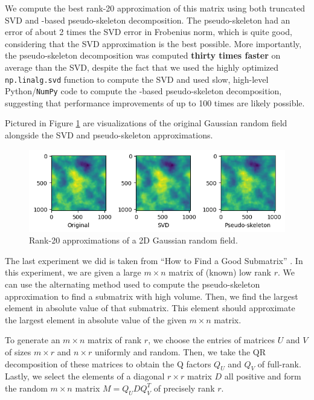 \documentclass{article}
\begin{document}
	We compute the best rank-20 approximation of this matrix using both truncated SVD and \maxvol{}-based pseudo-skeleton decomposition. The pseudo-skeleton had an error of about 2 times the SVD error in Frobenius norm, which is quite good, considering that the SVD approximation is the best possible. More importantly, the pseudo-skeleton decomposition was computed \textbf{thirty times faster} on average than the SVD, despite the fact that we used the highly optimized \texttt{np.linalg.svd} function to compute the SVD and used slow, high-level Python/\texttt{NumPy} code to compute the \maxvol{}-based pseudo-skeleton decomposition, suggesting that performance improvements of up to 100 times are likely possible.
	
	Pictured in Figure \ref{fig:reconstructions} are visualizations of the original Gaussian random field alongside the SVD and pseudo-skeleton approximations.
	\begin{figure}[h]
		\centering
		\includegraphics[width=\linewidth]{reconstructions.png}
		\caption{Rank-20 approximations of a 2D Gaussian random field.}
		\label{fig:reconstructions}
	\end{figure}
	
	
	The last experiment we did is taken from ``How to Find a Good Submatrix'' \cite{goreinov_2010}. In this experiment, we are given a large $m\times n$ matrix of (known) low rank $r$. We can use the alternating \maxvol{} method used to compute the pseudo-skeleton approximation to find a submatrix with high volume. Then, we find the largest element in absolute value of that submatrix. This element should approximate the largest element in absolute value of the given $m\times n$ matrix.
	
	To generate an $m \times n$ matrix of rank $r$, we choose the entries of matrices $U$ and $V$ of sizes $m\times r$ and $n\times r$ uniformly and random. Then, we take the QR decomposition of these matrices to obtain the Q factors $Q_U$ and $Q_V$ of full-rank. Lastly, we select the elements of a diagonal $r\times r$ matrix $D$ all positive and form the random $m\times n$ matrix $M = Q_UDQ_V^T$ of precisely rank $r$.
	
\end{document}
